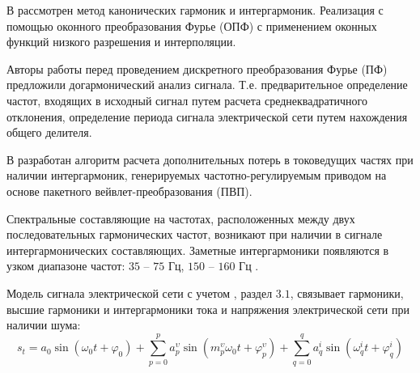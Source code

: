 В \cite{Improving_methods_Shizma_2014} рассмотрен метод канонических гармоник и интергармоник. Реализация с помощью оконного преобразования Фурье (ОПФ) с применением оконных функций низкого разрешения и интерполяции. 


Авторы \cite{Harmonic_analysis_Goldstein2009} работы перед проведением дискретного преобразования Фурье (ПФ) предложили догармонический анализ сигнала. Т.е. предварительное определение частот, входящих в исходный сигнал путем расчета среднеквадратичного отклонения, определение периода сигнала электрической сети путем нахождения общего делителя. 


В \cite{Development_method_Osipov_2017} разработан алгоритм расчета дополнительных потерь в токоведущих частях при наличии интергармоник, генерируемых частотно-регулируемым приводом на основе пакетного вейвлет-преобразования (ПВП).

Спектральные составляющие на частотах, расположенных между двух последовательных гармонических частот, возникают при наличии в сигнале интергармонических составляющих. 
Заметные интергармоники появляются в узком диапазоне частот: $35$ – $75$ Гц, $150$ – $160$ Гц \cite{Interharmonics_in_systems_Zhezhelenko_1999}.
 
Модель сигнала электрической сети с учетом \cite{GOST30804.4.7-2013}, раздел $3.1$, связывает гармоники, высшие гармоники и интергармоники тока и напряжения электрической сети при наличии шума: 
\begin{equation}
	\label{eq:equation6}
		s_{t} = a_{0} \sin (\omega_{0} t + \varphi_{0}) + \displaystyle\sum_{p=0}^{p} a_p^{\upsilon} \sin (m_p^{\upsilon} \omega_{0} t + \varphi_p^{\upsilon}) + \displaystyle\sum_{q=0}^{q} a_q^i \sin  (\omega_q^i t + \varphi_q^{i})
\end{equation}

